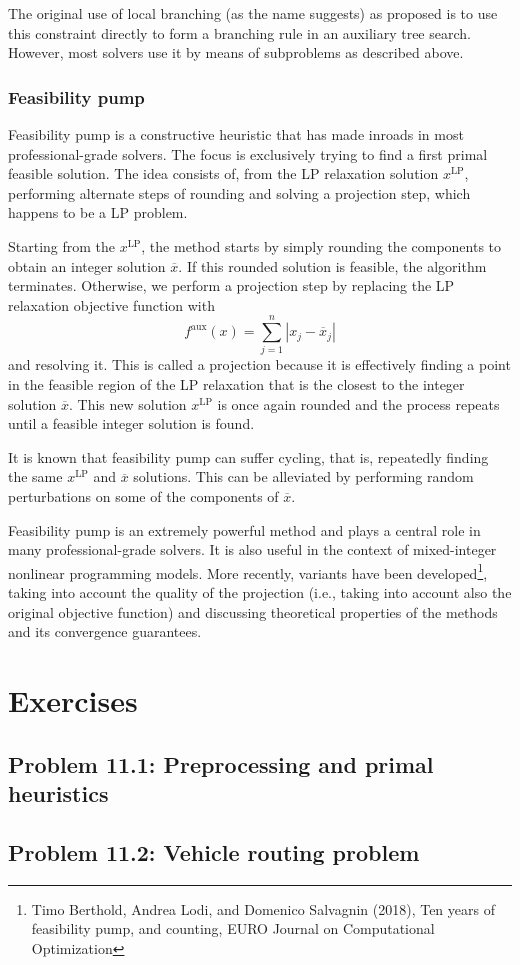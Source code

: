 The original use of local branching (as the name suggests) as proposed is to use this constraint directly to form a branching rule in an auxiliary tree search. However, most solvers use it by means of subproblems as  described above.  


  
\subsubsection{Feasibility pump}

Feasibility pump is a constructive heuristic that has made inroads in most professional-grade solvers. The focus is exclusively trying to find a first primal feasible solution. The idea consists of, from the LP relaxation solution $x^{\text{LP}}$, performing alternate steps of rounding and solving a projection step, which happens to be a LP problem.

Starting from the $x^{\text{LP}}$, the method starts by simply rounding the components to obtain an integer solution $\overline{x}$. If this rounded solution is feasible, the algorithm terminates. Otherwise, we perform a projection step by replacing the LP relaxation objective function with
	\begin{equation*}
		f^\text{aux}(x) = \sum_{j = 1}^n |x_j - \overline{x}_j|
	\end{equation*}
	and resolving it. This is called a projection because it is effectively finding a point in the feasible region of the LP relaxation that is the closest to the integer solution $\overline{x}$. This new solution $x^{\text{LP}}$ is once again rounded and the process repeats until a feasible integer solution is found.
	
It is known that feasibility pump can suffer cycling, that is, repeatedly finding	the same $x^{\text{LP}}$ and $\overline{x}$ solutions. This can be alleviated by performing random perturbations on some of the components of $\overline{x}$.

Feasibility pump is an extremely powerful method and plays a central role in many professional-grade solvers. It is also useful in the context of mixed-integer nonlinear programming models. More recently, variants have been developed\footnote{Timo Berthold, Andrea Lodi, and Domenico Salvagnin (2018), Ten years of feasibility pump, and counting, EURO Journal on Computational Optimization}, taking into account the quality of the projection (i.e., taking into account also the original objective function) and discussing theoretical properties of the methods and its convergence guarantees. 


\pagebreak

\section{Exercises}


\subsection*{Problem 11.1: Preprocessing and primal heuristics}


\subsection*{Problem 11.2: Vehicle routing problem}







